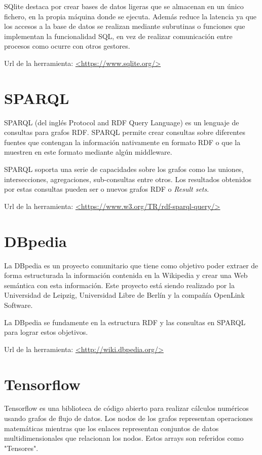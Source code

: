 SQlite destaca por crear bases de datos ligeras que se almacenan en un único fichero, en la propia máquina donde se ejecuta. Además reduce la latencia ya que los accesos a la base de datos se realizan mediante subrutinas o funciones que implementan la funcionalidad SQL, en vez de realizar comunicación entre procesos como ocurre con otros gestores.\cite{wiki:SQlite}

Url de la herramienta: \url{<https://www.sqlite.org/>}

\section{SPARQL}

SPARQL (del inglés Protocol and RDF Query Language) es un lenguaje de consultas para grafos RDF. SPARQL permite crear consultas sobre diferentes fuentes que contengan la información nativamente en formato RDF o que la muestren en este formato mediante algún middleware.\cite{SPARQL}

SPARQL soporta una serie de capacidades sobre los grafos como las uniones, intersecciones, agregaciones, sub-consultas entre otros. Los resultados obtenidos por estas consultas pueden ser o nuevos grafos RDF o \textit{Result sets}.

Url de la herramienta: \url{<https://www.w3.org/TR/rdf-sparql-query/>}


\section{DBpedia}

La DBpedia es un proyecto comunitario que tiene como objetivo poder extraer de forma estructurada la información contenida en la Wikipedia y crear una Web semántica con esta información. Este proyecto está siendo realizado por la Universidad de Leipzig, Universidad Libre de Berlín y la compañía OpenLink Software. \cite{wiki:DBpedia}

La DBpedia se fundamente en la estructura RDF y las consultas en SPARQL para lograr estos objetivos.

Url de la herramienta: \url{<http://wiki.dbpedia.org/>}

\section{Tensorflow}

Tensorflow es una biblioteca de código abierto para realizar cálculos numéricos usando grafos de flujo de datos. Los nodos de los grafos representan operaciones matemáticas mientras que los enlaces representan conjuntos de datos multidimensionales que relacionan los nodos. Estos arrays son referidos como "Tensores".\cite{wiki:Tensorflow}

